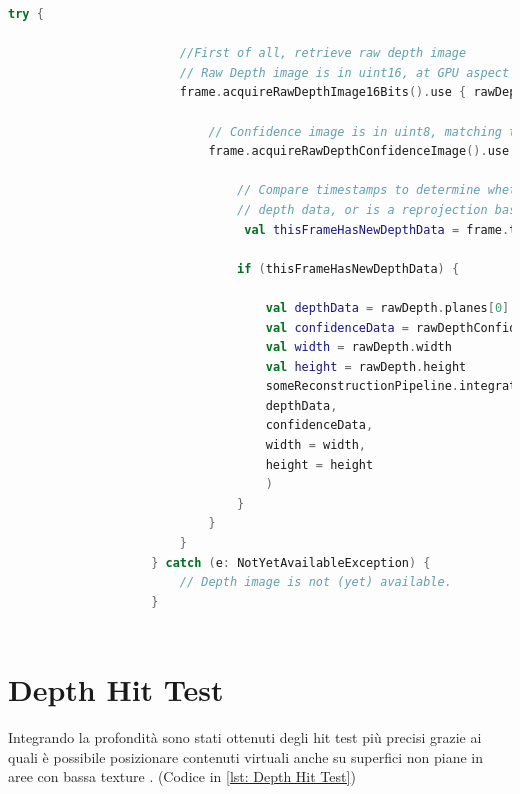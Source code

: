 \documentclass[crop=false, class=book]{standalone}
\begin{document}
		\begin{center}
				\begin{minipage}{0.95\textwidth}
					\begin{lstlisting}[caption={Estrazione di un'immagine di confidenza}, label={lst: confidence-image}, language=Kotlin]
					 try {
					 
					 	//First of all, retrieve raw depth image
  						// Raw Depth image is in uint16, at GPU aspect ratio, in native orientation.
  						frame.acquireRawDepthImage16Bits().use { rawDepth ->
  						
    						// Confidence image is in uint8, matching the depth image size.
    						frame.acquireRawDepthConfidenceImage().use { rawDepthConfidence ->
    						
      							// Compare timestamps to determine whether depth is is based on new
      							// depth data, or is a reprojection based on device movement.
     							 val thisFrameHasNewDepthData = frame.timestamp == rawDepth.timestamp
     							 
      							if (thisFrameHasNewDepthData) {
      							
        							val depthData = rawDepth.planes[0].buffer
        							val confidenceData = rawDepthConfidence.planes[0].buffer
        							val width = rawDepth.width
        							val height = rawDepth.height
        							someReconstructionPipeline.integrateNewImage(
          							depthData,
          							confidenceData,
         						 	width = width,
          							height = height
        							)
      							}
    						}
  						}
					} catch (e: NotYetAvailableException) {
  						// Depth image is not (yet) available.
					}
					
				\end{lstlisting}
			\end{minipage}
		\end{center}
		
		\section{Depth Hit Test}
		
		Integrando la profondità sono stati ottenuti degli hit test più precisi grazie ai quali è possibile  							posizionare contenuti virtuali anche su superfici non piane in aree con bassa texture \cite{google2022depth}. (Codice 			in \vref{lst: Depth Hit Test})\\
\end{document}
